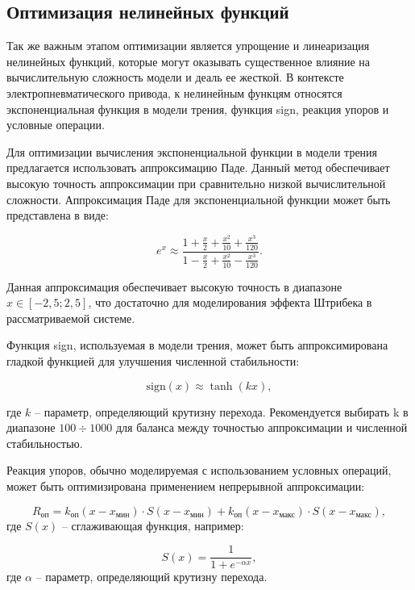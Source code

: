 \subsection{Оптимизация нелинейных функций}\label{sec:ch2/sec5/subsec2}

Так же важным этапом оптимизации является упрощение и линеаризация нелинейных функций,
которые могут оказывать существенное влияние на вычислительную сложность модели и деаль ее
жесткой. В контексте электропневматического привода, к нелинейным функцям относятся экспоненциальная
функция в модели трения, функция sign, реакция упоров и условные операции.

Для оптимизации вычисления экспоненциальной функции в модели трения предлагается использовать аппроксимацию Паде.
Данный метод обеспечивает высокую точность аппроксимации при сравнительно низкой вычислительной
сложности. Аппроксимация Паде для экспоненциальной функции может быть представлена в виде:

\begin{equation*}
    e^x \approx \frac{1 + \frac{x}{2} + \frac{x^2}{10} + \frac{x^3}{120}}{1 - \frac{x}{2} + \frac{x^2}{10} - \frac{x^3}{120}}.
\end{equation*}

Данная аппроксимация обеспечивает высокую точность в диапазоне $x \in [-2,5; 2,5]$,
что достаточно для моделирования эффекта Штрибека в рассматриваемой системе.

Функция sign, используемая в модели трения, может быть аппроксимирована
гладкой функцией для улучшения численной стабильности:

\begin{equation*}
    \text{sign}(x) \approx \tanh(kx),
\end{equation*}

где $k$ -- параметр, определяющий крутизну перехода. Рекомендуется выбирать k в диапазоне
$100 \div 1000$ для баланса между точностью аппроксимации и численной стабильностью.

Реакция упоров, обычно моделируемая с использованием условных операций, может быть
оптимизирована применением непрерывной аппроксимации:

\begin{equation*}
    R_\text{оп} = k_\text{оп}(x - x_\text{мин})\cdot S(x - x_\text{мин}) + k_\text{оп}(x - x_\text{макс})\cdot S(x - x_\text{макс}),
\end{equation*}
где $S(x)$ -- сглаживающая функция, например:

\begin{equation*}
    S(x) = \frac{1}{1 + e^{-\alpha x}},
\end{equation*}
где $\alpha$ -- параметр, определяющий крутизну перехода.

